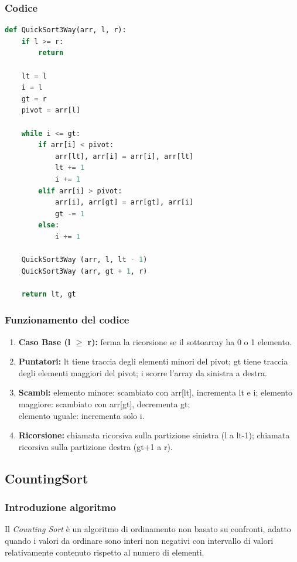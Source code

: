 \documentclass[a4paper, 11pt]{article}
\begin{document}
\subsubsection{Codice}
\begin{lstlisting}[style=mycodestyle, language=Python]
    def QuickSort3Way(arr, l, r):
    if l >= r:
        return

    lt = l
    i = l
    gt = r
    pivot = arr[l]

    while i <= gt:
        if arr[i] < pivot:
            arr[lt], arr[i] = arr[i], arr[lt]
            lt += 1
            i += 1
        elif arr[i] > pivot:
            arr[i], arr[gt] = arr[gt], arr[i]
            gt -= 1
        else:
            i += 1

    QuickSort3Way (arr, l, lt - 1)
    QuickSort3Way (arr, gt + 1, r)

    return lt, gt
\end{lstlisting}

\subsubsection*{Funzionamento del codice}

\begin{enumerate}
  \item \textbf{Caso Base (l $\geq$ r):} ferma la ricorsione se il sottoarray ha 0 o 1 elemento.

  \item \textbf{Puntatori:} lt tiene traccia degli elementi minori del pivot; gt tiene traccia degli elementi maggiori del pivot; i scorre l'array da sinistra a destra.

  \item \textbf{Scambi:} elemento minore: scambiato con arr[lt], incrementa lt e i; elemento maggiore: scambiato con arr[gt], decrementa gt; \\ elemento uguale: incrementa solo i.

  \item \textbf{Ricorsione:} chiamata ricorsiva sulla partizione sinistra (l a lt-1); chiamata ricorsiva sulla partizione destra (gt+1 a r).
\end{enumerate}

\subsection{CountingSort}

\subsubsection*{Introduzione algoritmo}
Il \emph{Counting Sort} è un algoritmo di ordinamento non basato su confronti, adatto quando i valori da ordinare sono interi non negativi con intervallo di valori relativamente contenuto rispetto al numero di elementi.
\end{document}
